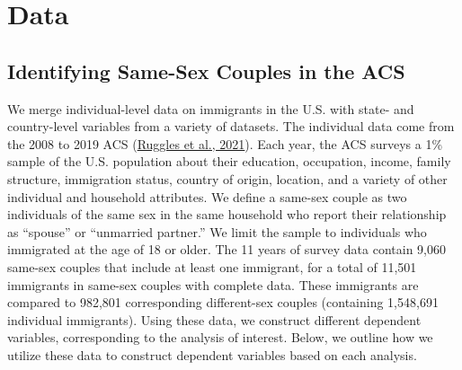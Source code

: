 \documentclass[
  11pt,
]{article}
\begin{document}
\hypertarget{data}{%
\section{Data}\label{data}}

\hypertarget{identifying-same-sex-couples-in-the-acs}{%
\subsection{Identifying Same-Sex Couples in the ACS}\label{identifying-same-sex-couples-in-the-acs}}

We merge individual-level data on immigrants in the U.S. with state- and country-level variables from a variety of datasets. The individual data come from the 2008 to 2019 ACS (\protect\hyperlink{ref-ruggles_2021}{Ruggles et al., 2021}). Each year, the ACS surveys a 1\% sample of the U.S. population about their education, occupation, income, family structure, immigration status, country of origin, location, and a variety of other individual and household attributes. We define a same-sex couple as two individuals of the same sex in the same household who report their relationship as ``spouse'' or ``unmarried partner.'' We limit the sample to individuals who immigrated at the age of 18 or older. The 11 years of survey data contain 9,060 same-sex couples that include at least one immigrant, for a total of 11,501 immigrants in same-sex couples with complete data. These immigrants are compared to 982,801 corresponding different-sex couples (containing 1,548,691 individual immigrants). Using these data, we construct different dependent variables, corresponding to the analysis of interest. Below, we outline how we utilize these data to construct dependent variables based on each analysis.
\end{document}

